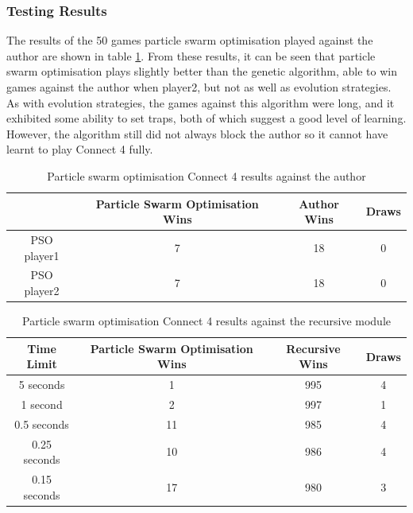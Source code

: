 \subsubsection{Testing Results}
The results of the 50 games particle swarm optimisation played against the author are shown in table \ref{tab:psome}. From these results, it can be seen that particle swarm optimisation plays slightly better than the genetic algorithm, able to win games against the author when player2, but not as well as evolution strategies. As with evolution strategies, the games against this algorithm were long, and it exhibited some ability to set traps, both of which suggest a good level of learning. However, the algorithm still did not always block the author so it cannot have learnt to play Connect 4 fully. 
\begin{table}[tp]
   \begin{minipage}{\textwidth}
      \begin{center}
         \begin{tabular}{c|c|c|c}
           & Particle Swarm Optimisation Wins & Author Wins & Draws\\
           \hline
           PSO player1 & 7 & 18 & 0 \\
           PSO player2 & 7 & 18 & 0
         \end{tabular}
      \end{center}
   \end{minipage}
   \caption{Particle swarm optimisation Connect 4 results against the author}
   \label{tab:psome}
\end{table}
\begin{table}[tp]
   \begin{minipage}{\textwidth}
      \begin{center}
         \begin{tabular}{c|c|c|c}
           Time Limit & Particle Swarm Optimisation Wins & Recursive Wins & Draws\\
           \hline
           5 seconds & 1 & 995 & 4 \\
           1 second & 2 & 997 & 1 \\
           0.5 seconds & 11 & 985 & 4 \\
           0.25 seconds & 10 & 986 & 4 \\
           0.15 seconds & 17 & 980 & 3
         \end{tabular}
      \end{center}
   \end{minipage}
   \caption{Particle swarm optimisation Connect 4 results against the recursive module}
   \label{tab:psore}
\end{table}
